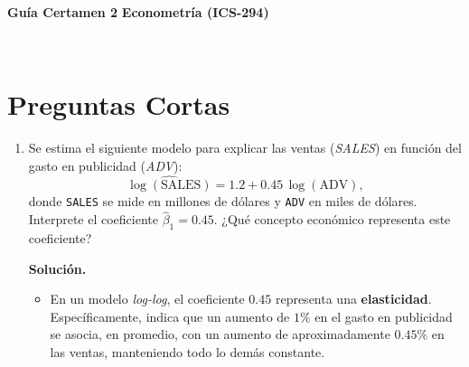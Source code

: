 \documentclass[10pt,a4paper]{article}
\begin{document}
\vspace{5cm}



\begin{center}
\begin{large}
\textbf{\\Gu\'ia Certamen 2}
\textbf{Econometría (ICS-294)}
\end{large}\\
\end{center}


\section{Preguntas Cortas}

\begin{enumerate}
    \item Se estima el siguiente modelo para explicar las ventas (\emph{SALES})
        en función del gasto en publicidad (\emph{ADV}):
        \[
          \widehat{\log(\text{SALES})}
          = 1.2 + 0.45\,\log(\text{ADV}) ,
        \]
        donde \texttt{SALES} se mide en millones de dólares y \texttt{ADV}
        en miles de dólares. Interprete el coeficiente \(\hat{\beta}_1 = 0.45\). ¿Qué concepto económico representa este coeficiente?\\

      {\color{blue}  \textbf{Solución.}
        \begin{itemize}
          \item En un modelo \emph{log-log}, el coeficiente \(0.45\)
                representa una \textbf{elasticidad}.
                Específicamente, indica que un aumento de \(1\%\) en el gasto
                en publicidad se asocia, en promedio, con un aumento de
                aproximadamente \(0.45\%\) en las ventas, manteniendo todo
                lo demás constante.
        \end{itemize}
        }
        

\end{enumerate}
\end{document}
